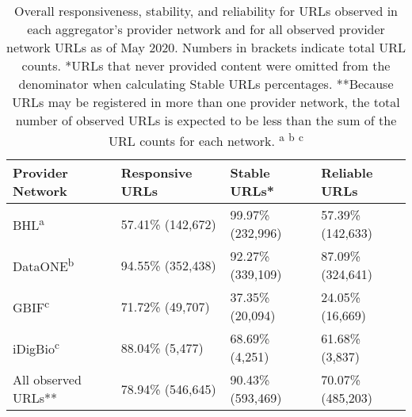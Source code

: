 \begin{table}[!ht]
\begin{adjustwidth}{0in}{0in} %
\centering
\begin{tabular}{llll}
\hline
{\bf Provider Network} & {\bf Responsive URLs} & {\bf Stable URLs*} & {\bf Reliable URLs} \\ \hline
BHL\textsuperscript{a} & 57.41\% (142,672) & 99.97\% (232,996) & 57.39\% (142,633) \\
DataONE\textsuperscript{b} & 94.55\% (352,438) & 92.27\% (339,109) & 87.09\% (324,641) \\
GBIF\textsuperscript{c} & 71.72\% (49,707) & 37.35\% (20,094) & 24.05\% (16,669) \\
iDigBio\textsuperscript{c} & 88.04\% (5,477) & 68.69\% (4,251) & 61.68\% (3,837)  \\
All observed URLs** & 78.94\% (546,645) & 90.43\% (593,469) & 70.07\% (485,203) \\ \hline
\end{tabular}
\caption{Overall responsiveness, stability, and reliability for URLs observed in each aggregator's provider network and for all observed provider network URLs as of May 2020. Numbers in brackets indicate total URL counts.
*URLs that never provided content were omitted from the denominator when calculating Stable URLs percentages.
**Because URLs may be registered in more than one provider network, the total number of observed URLs is expected to be less than the sum of the URL counts for each network.
\textsuperscript{a}\citet{poelen_jorrit_h_2019_3484555}
\textsuperscript{b}\citet{poelen_jorrit_h_2019_3483218}
\textsuperscript{c}\citet{poelen_jorrit_h_2019_3484205}
}
\label{table1}
\end{adjustwidth}
\end{table}
